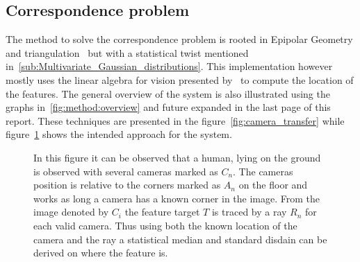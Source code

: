 \subsection{Correspondence problem}
The method to solve the correspondence problem is rooted in  Epipolar Geometry and triangulation~\cite{siciliano2010robotics} but with a statistical twist mentioned in~\ref{sub:Multivariate_Gaussian_distributions}.
This implementation however mostly uses the linear algebra for vision presented by~\cite{corke2017robotics} to compute the location of the features.
The general overview of the system is also illustrated using the graphs in~\ref{fig:method:overview} and future expanded in the last page of this report.
These techniques are presented in the figure~\ref{fig:camera_transfer} while figure~\ref{fig:3Dhuman} shows the intended approach for the system.
\def\svgwidth{\columnwidth}
\begin{figure}[ht]
    \centering
           
           \caption[3D human on ground]{
               In this figure it can be observed that a human, lying on the ground is observed with several cameras marked as $C_n$.
               The cameras position is relative to the \aruco corners marked as $A_n$ on the floor and works as long a camera has a known \aruco corner in the image.
               From the image denoted by
               $C_i$
               the feature target $T$ is traced by a ray $R_n$ for each valid camera.
               Thus using both the known location of the camera and the ray a statistical median and standard disdain can be derived on where the feature is.
           }
    \label{fig:3Dhuman}
\end{figure}





